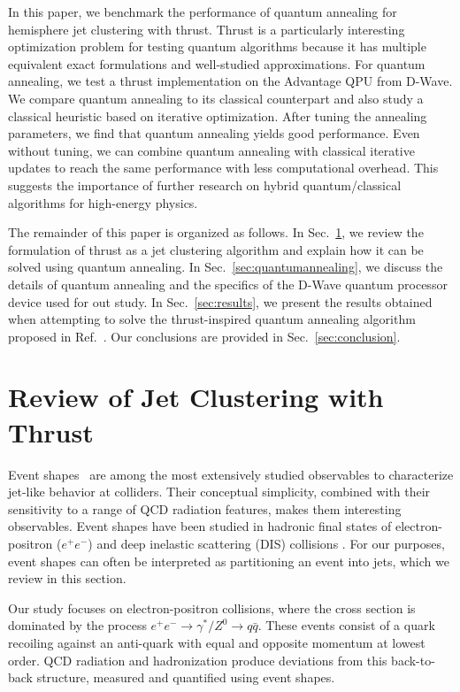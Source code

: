\documentclass[aps,prd,twocolumn,superscriptaddress,preprintnumbers,nofootinbib,longbibliography,floatfix]{revtex4-1}
\DeclareRobustCommand{\Sec}[1]{Sec.~\ref{sec:#1}}
\DeclareRobustCommand{\Ref}[1]{Ref.~\cite{#1}}
\begin{document}
In this paper, we benchmark the performance of quantum annealing for hemisphere jet clustering with thrust.
%
Thrust is a particularly interesting optimization problem for testing quantum algorithms because it has multiple equivalent exact formulations and well-studied approximations.
%
For quantum annealing, we test a thrust implementation on the Advantage QPU from D-Wave.
%
We compare quantum annealing to its classical counterpart and also study a classical heuristic based on iterative optimization.
%
After tuning the annealing parameters, we find that quantum annealing yields good performance.
%
Even without tuning, we can combine quantum annealing with classical iterative updates to reach the same performance with less computational overhead.
%
This suggests the importance of further research on hybrid quantum/classical algorithms for high-energy physics.


The remainder of this paper is organized as follows.
%
In \Sec{review}, we review the formulation of thrust as a jet clustering algorithm and explain how it can be solved using quantum annealing.
%
In \Sec{quantumannealing}, we discuss the details of quantum annealing and the specifics of the D-Wave quantum processor device used for out study.
%
In \Sec{results}, we present the results obtained when attempting to solve the thrust-inspired quantum annealing algorithm proposed in \Ref{PhysRevD.101.094015}.
%
Our conclusions are provided in \Sec{conclusion}.


\section{Review of Jet Clustering with Thrust}
\label{sec:review}

Event shapes~\cite{PhysRevLett.35.1609} are among the most extensively studied observables to characterize jet-like behavior at colliders.
%
Their conceptual simplicity, combined with their sensitivity to a range of QCD radiation features, makes them interesting observables.
%
Event shapes have been studied in hadronic final states of electron-positron ($e^{+}e^{-}$) and deep inelastic scattering (DIS) collisions \cite{Dasgupta2004,2006MESV,Mele2008}. 
%
For our purposes, event shapes can often be interpreted as partitioning an event into jets, which we review in this section.


Our study focuses on electron-positron collisions, where the cross section is dominated by the process $e^{+}e^{-}\rightarrow\gamma^{*}/Z^{0}\rightarrow q\bar{q}$.
%
These events consist of a quark recoiling against an anti-quark with equal and opposite momentum at lowest order.
%
QCD radiation and hadronization produce deviations from this back-to-back structure, measured and quantified using event shapes.
\end{document}

